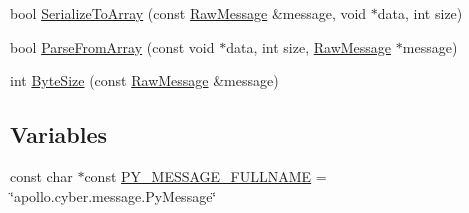 \begin{DoxyCompactItemize}
\item 
bool \hyperlink{namespaceapollo_1_1cyber_1_1message_a94bcdf7f75627047514bcbdc059c7ac6}{Serialize\-To\-Array} (const \hyperlink{structapollo_1_1cyber_1_1message_1_1RawMessage}{Raw\-Message} \&message, void $\ast$data, int size)
\item 
bool \hyperlink{namespaceapollo_1_1cyber_1_1message_a76d31ca5297e7c40fbd682756159e8ff}{Parse\-From\-Array} (const void $\ast$data, int size, \hyperlink{structapollo_1_1cyber_1_1message_1_1RawMessage}{Raw\-Message} $\ast$message)
\item 
int \hyperlink{namespaceapollo_1_1cyber_1_1message_a3d9bb094a125aa150c25b2b50a40cc97}{Byte\-Size} (const \hyperlink{structapollo_1_1cyber_1_1message_1_1RawMessage}{Raw\-Message} \&message)
\end{DoxyCompactItemize}
\subsection*{Variables}
\begin{DoxyCompactItemize}
\item 
const char $\ast$const \hyperlink{namespaceapollo_1_1cyber_1_1message_a365817ca48261ee138abde4580d63af9}{P\-Y\-\_\-\-M\-E\-S\-S\-A\-G\-E\-\_\-\-F\-U\-L\-L\-N\-A\-M\-E} = \char`\"{}apollo.\-cyber.\-message.\-Py\-Message\char`\"{}
\end{DoxyCompactItemize}


